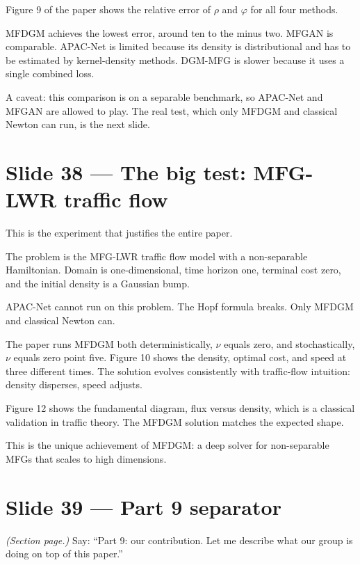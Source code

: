 \documentclass[11pt]{article}
\begin{document}
Figure 9 of the paper shows the relative error of $\rho$ and $\varphi$ for
all four methods.

MFDGM achieves the lowest error, around ten to the minus two.
MFGAN is comparable. APAC-Net is limited because its density is
distributional and has to be estimated by kernel-density methods.
DGM-MFG is slower because it uses a single combined loss.

A caveat: this comparison is on a separable benchmark, so APAC-Net and
MFGAN are allowed to play. The real test, which only MFDGM and classical
Newton can run, is the next slide.

\section*{Slide 38 --- The big test: MFG-LWR traffic flow}

This is the experiment that justifies the entire paper.

The problem is the MFG-LWR traffic flow model with a non-separable
Hamiltonian. Domain is one-dimensional, time horizon one, terminal cost
zero, and the initial density is a Gaussian bump.

APAC-Net cannot run on this problem. The Hopf formula breaks. Only MFDGM
and classical Newton can.

The paper runs MFDGM both deterministically, $\nu$ equals zero, and
stochastically, $\nu$ equals zero point five. Figure 10 shows the density,
optimal cost, and speed at three different times. The solution evolves
consistently with traffic-flow intuition: density disperses, speed adjusts.

Figure 12 shows the fundamental diagram, flux versus density, which is a
classical validation in traffic theory. The MFDGM solution matches the
expected shape.

This is the unique achievement of MFDGM: a deep solver for non-separable
MFGs that scales to high dimensions.

\section*{Slide 39 --- Part 9 separator}

\textit{(Section page.)}  Say: ``Part 9: our contribution. Let me describe
what our group is doing on top of this paper.''

\end{document}
